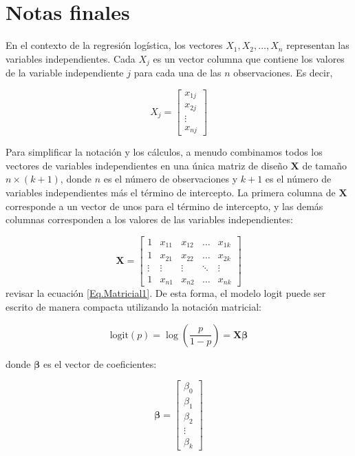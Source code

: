 \section*{Notas finales}

En el contexto de la regresión logística, los vectores $X_1, X_2, \ldots, X_n$ representan las variables independientes. Cada $X_j$ es un vector columna que contiene los valores de la variable independiente $j$ para cada una de las $n$ observaciones. Es decir,

\begin{equation}
X_j = \begin{bmatrix}
x_{1j} \\
x_{2j} \\
\vdots \\
x_{nj}
\end{bmatrix}
\end{equation}

Para simplificar la notación y los cálculos, a menudo combinamos todos los vectores de variables independientes en una única matriz de diseño $\mathbf{X}$ de tamaño $n \times (k+1)$, donde $n$ es el número de observaciones y $k+1$ es el número de variables independientes más el término de intercepto. La primera columna de $\mathbf{X}$ corresponde a un vector de unos para el término de intercepto, y las demás columnas corresponden a los valores de las variables independientes:

\begin{equation}
\mathbf{X} = \begin{bmatrix}
1 & x_{11} & x_{12} & \ldots & x_{1k} \\
1 & x_{21} & x_{22} & \ldots & x_{2k} \\
\vdots & \vdots & \vdots & \ddots & \vdots \\
1 & x_{n1} & x_{n2} & \ldots & x_{nk}
\end{bmatrix}
\end{equation}
revisar la ecuaci\'on \ref{Eq.Matricial1}. De esta forma, el modelo logit puede ser escrito de manera compacta utilizando la notación matricial:

\begin{equation}
\text{logit}(p) = \log\left(\frac{p}{1-p}\right) = \mathbf{X} \boldsymbol{\beta}
\end{equation}

donde $\boldsymbol{\beta}$ es el vector de coeficientes:

\begin{equation}
\boldsymbol{\beta} = \begin{bmatrix}
\beta_0 \\
\beta_1 \\
\beta_2 \\
\vdots \\
\beta_k
\end{bmatrix}
\end{equation}

